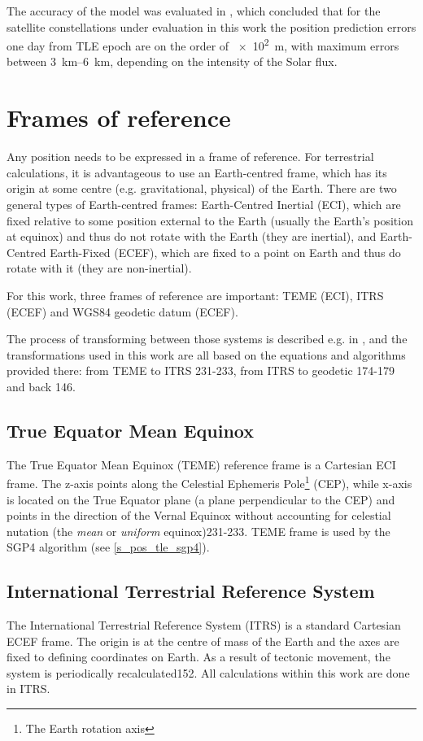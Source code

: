 The accuracy of the model was evaluated in \cite{pos07}, which concluded that for the satellite constellations under evaluation in this work the position prediction errors one day from TLE epoch are on the order of \qty{e2}{m}, with maximum errors between \qtyrange{3}{6}{km}, depending on the intensity of the Solar flux.


\section{Frames of reference}
\label{s_pos_frames_of_ref}
Any position needs to be expressed in a frame of reference. For terrestrial calculations, it is advantageous to use an Earth-centred frame, which has its origin at some centre (e.g. gravitational, physical) of the Earth. There are two general types of Earth-centred frames: Earth-Centred Inertial (ECI), which are fixed relative to some position external to the Earth (usually the Earth's position at equinox) and thus do not rotate with the Earth (they are inertial), and Earth-Centred Earth-Fixed (ECEF), which are fixed to a point on Earth and thus do rotate with it (they are non-inertial).

For this work, three frames of reference are important: TEME (ECI), ITRS (ECEF) and WGS84 geodetic datum (ECEF).

The process of transforming between those systems is described e.g. in \cite{pos01}, and the transformations used in this work are all based on the equations and algorithms provided there: from TEME to ITRS \citep{pos01}{231-233}, from ITRS to geodetic \citep{pos01}{174-179} and back \citep{pos01}{146}.

\subsection{True Equator Mean Equinox}
The True Equator Mean Equinox (TEME) reference frame is a Cartesian ECI frame. The z-axis points along the Celestial Ephemeris Pole\footnote{The Earth rotation axis} (CEP), while x-axis is located on the True Equator plane (a plane perpendicular to the CEP) and points in the direction of the Vernal Equinox without accounting for celestial nutation (the \textit{mean} or \textit{uniform} equinox)\citep{pos01}{231-233}. TEME frame is used by the SGP4 algorithm (see \autoref{s_pos_tle_sgp4}).

\subsection{International Terrestrial Reference System}
The International Terrestrial Reference System (ITRS) is a standard Cartesian ECEF frame. The origin is at the centre of mass of the Earth and the axes are fixed to defining coordinates on Earth. As a result of tectonic movement, the system is periodically recalculated\citep{pos01}{152}. All calculations within this work are done in ITRS.

